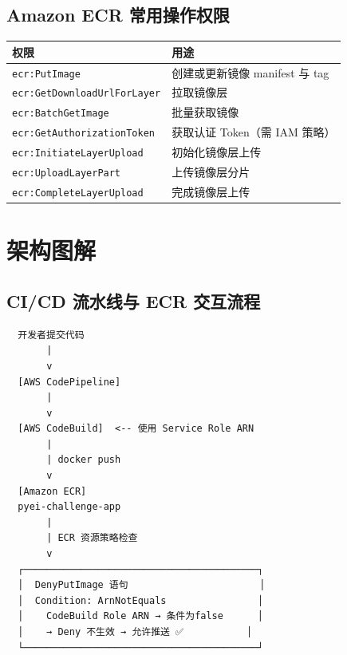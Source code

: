 \documentclass[12pt, a4paper]{article}
\begin{document}
\subsection{Amazon ECR 常用操作权限}

\begin{center}
\begin{tabular}{ll}
  \toprule
  \textbf{权限} & \textbf{用途} \\
  \midrule
  \texttt{ecr:PutImage} & 创建或更新镜像 manifest 与 tag \\
  \texttt{ecr:GetDownloadUrlForLayer} & 拉取镜像层 \\
  \texttt{ecr:BatchGetImage} & 批量获取镜像 \\
  \texttt{ecr:GetAuthorizationToken} & 获取认证 Token（需 IAM 策略）\\
  \texttt{ecr:InitiateLayerUpload} & 初始化镜像层上传 \\
  \texttt{ecr:UploadLayerPart} & 上传镜像层分片 \\
  \texttt{ecr:CompleteLayerUpload} & 完成镜像层上传 \\
  \bottomrule
\end{tabular}
\end{center}

\section{架构图解}

\subsection{CI/CD 流水线与 ECR 交互流程}

\begin{infobox}
\begin{verbatim}
  开发者提交代码
       |
       v
  [AWS CodePipeline]
       |
       v
  [AWS CodeBuild]  <-- 使用 Service Role ARN
       |
       | docker push
       v
  [Amazon ECR]
  pyei-challenge-app
       |
       | ECR 资源策略检查
       v
  ┌─────────────────────────────────────────┐
  │  DenyPutImage 语句                       │
  │  Condition: ArnNotEquals                │
  │    CodeBuild Role ARN → 条件为false      │
  │    → Deny 不生效 → 允许推送 ✅           │
  └─────────────────────────────────────────┘
\end{verbatim}
\end{infobox}
\end{document}
